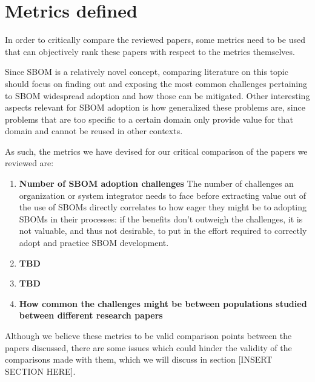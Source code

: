 \section{Metrics defined} \label{metrics}

In order to critically compare the reviewed papers, some metrics need to be used that can objectively rank these papers with respect to the metrics themselves.

Since SBOM is a relatively novel concept, comparing literature on this topic should focus on finding out and exposing the most common challenges pertaining to SBOM widespread adoption and how those can be mitigated. Other interesting aspects relevant for SBOM adoption is how generalized these problems are, since problems that are too specific to a certain domain only provide value for that domain and cannot be reused in other contexts.

As such, the metrics we have devised for our critical comparison of the papers we reviewed are:

\begin{enumerate}
    \item \textbf{Number of SBOM adoption challenges} The number of challenges an organization or system integrator needs to face before extracting value out of the use of SBOMs directly correlates to how eager they might be to adopting SBOMs in their processes: if the benefits don't outweigh the challenges, it is not valuable, and thus not desirable, to put in the effort required to correctly adopt and practice SBOM development.
    \item \textbf{TBD}
    \item \textbf{TBD}
    \item \textbf{How common the challenges might be between populations studied between different research papers}
\end{enumerate}


Although we believe these metrics to be valid comparison points between the papers discussed, there are some issues which could hinder the validity of the comparisons made with them, which we will discuss in section [INSERT SECTION HERE].